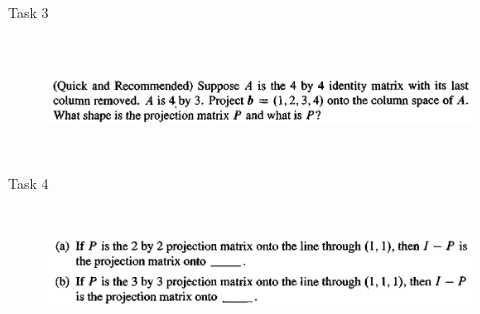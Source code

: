 \documentclass[aspectratio=169]{beamer}
\begin{document}
\begin{frame}[t]{Task 3}
    \framesubtitle{}
    \begin{figure}[H]
        \centering\includegraphics[height=3cm,width=1\textwidth,keepaspectratio]{3.png}
        \label{fig:3.png}
    \end{figure}
\end{frame}

\begin{frame}[t]{Task 4}
    \framesubtitle{}
    \begin{figure}[H]
        \centering\includegraphics[height=3cm,width=1\textwidth,keepaspectratio]{4.png}
        \label{fig:4.png}
    \end{figure}
\end{frame}
\end{document}
